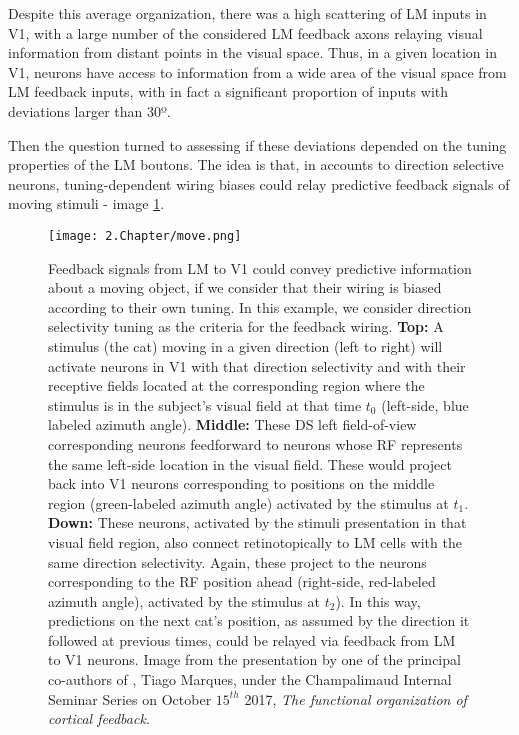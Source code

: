 Despite this average organization, there was a high scattering of LM inputs in V1, with a large number of the considered LM feedback axons relaying visual information from distant points in the visual space. Thus, in a given location in V1, neurons have access to information from a wide area of the visual space from LM feedback inputs, with in fact a significant proportion of inputs with deviations larger than 30º.

Then the question turned to assessing if these deviations depended on the tuning properties of the LM boutons. The idea is that, in accounts to direction selective neurons, tuning-dependent wiring biases could relay predictive feedback signals of moving stimuli - image \ref{move}.

\begin{figure}[h]
\center
\texttt{[image: 2.Chapter/move.png]}
\caption{Feedback signals from LM to V1 could convey predictive information about a moving object, if we consider that their wiring is biased according to their own tuning. In this example, we consider direction selectivity tuning as the criteria for the feedback wiring. \newline \textbf{Top:} A stimulus (the cat) moving in a given direction (left to right) will activate neurons in V1 with that direction selectivity and with their receptive fields located at the corresponding region where the stimulus is in the subject's visual field at that time $t_0$ (left-side, blue labeled azimuth angle). \newline \textbf{Middle:} These DS left field-of-view corresponding neurons feedforward to neurons whose RF represents the same left-side location in the visual field. These would project back into V1 neurons corresponding to positions on the middle region (green-labeled azimuth angle) activated by the stimulus at $t_1$. \newline \textbf{Down: } These neurons, activated by the stimuli presentation in that visual field region, also connect retinotopically to LM cells with the same direction selectivity. Again, these project to the neurons corresponding to the RF position ahead (right-side, red-labeled azimuth angle), activated by the stimulus at $t_2$). \newline In this way, predictions on the next cat's position, as assumed by the direction it followed at previous times, could be relayed via feedback from LM to V1 neurons.
\newline \newline \tiny{Image from the presentation by one of the principal co-authors of \cite{Tiago}, Tiago Marques, under the Champalimaud Internal Seminar Series on October $15^{th}$ 2017, \textit{The functional organization of cortical feedback}.}} 
\label{move}
\end{figure}

